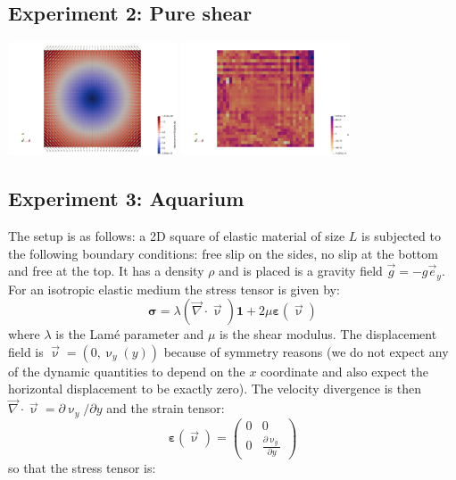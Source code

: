 \subsection*{Experiment 2: Pure shear }


\begin{center}
\includegraphics[width=5cm]{python_codes/fieldstone_34/results/exp2/disp}
\includegraphics[width=5cm]{python_codes/fieldstone_34/results/exp2/p}
\end{center}





\subsection*{Experiment 3: Aquarium}

The setup is as follows: a 2D square of elastic material of size $L$ is 
subjected to the following boundary conditions: free slip on the sides, no slip at the 
bottom and free at the top. It has a density $\rho$ and is placed is a gravity 
field ${\vec g}=-g {\vec e}_y$.
For an isotropic elastic medium the stress tensor is given by:
\[
{\bm \sigma} = \lambda ({\vec \nabla}\cdot{\vec \upnu}) {\bm 1} + 2 \mu {\bm \varepsilon}(\vec\upnu)
\]
where $\lambda$ is the Lam{\'e} parameter and $\mu$ is the shear modulus.
The displacement field is ${\vec \upnu}=(0,\upnu_y(y))$ because of symmetry reasons 
(we do not expect any of the dynamic quantities to depend on the $x$ coordinate and 
also expect the horizontal displacement to be exactly zero).
The velocity divergence is then ${\vec \nabla}\cdot{\vec \upnu} = \partial \upnu_y/\partial y$
and the strain tensor:
\[
{\bm \varepsilon}(\vec \upnu)
=
\left(
\begin{array}{cc}
0 & 0 \\
0 & \frac{\partial \upnu_y}{\partial y}
\end{array}
\right)
\]
so that the stress tensor is:

